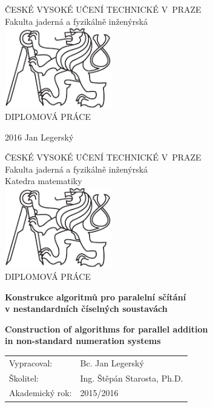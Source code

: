 \documentclass[a4paper, 11pt]{report}
\theoremstyle{definition}
\newcommand{\cvut}{ČESKÉ VYSOKÉ UČENÍ TECHNICKÉ V~PRAZE}
\newcommand{\fjfi}{Fakulta jaderná a fyzikálně inženýrská}
\newcommand{\km}{Katedra matematiky}
\newcommand{\nazevczBreaked}{Konstrukce algoritm\r u pro paraleln\'i s\v c\'it\'an\'i \\ v nestandardn\'ich \v c\'iseln\'ych soustav\'ach}
\newcommand{\nazevenBreaked}{Construction of algorithms for parallel addition  \\ in non-standard numeration systems}
\newcommand{\autor}{Bc. Jan Legersk\'y}
\newcommand{\vedouci}{Ing. \v St\v ep\'an Starosta, Ph.D.}
\begin{document}
\begin{titlepage}

 \thispagestyle{empty}
 \begin{center}
 	{\Large \cvut \\[12pt] \fjfi\\}   %
 	\vspace{45pt}
 	\includegraphics[height=100pt]{img/logoCVUT.pdf}\\  %
 	\vspace{160pt}
 	{\Huge DIPLOMOV\'A PR\'ACE}
 \end{center}
 \vfill
 {
 	\Large 2016 \hfill Jan Legersk\'y
 }
 \newpage


\thispagestyle{empty}
\begin{center}
	{\Large \cvut \\[10pt] \fjfi \\[10pt] \km\\}
	\vspace{45pt} %
	\includegraphics[height=100pt]{img/logoCVUT.pdf}\\
	\vspace{90pt}
	{\Large DIPLOMOV\'A PR\'ACE}
	\vspace{90pt}
	
	{\Large\bf \nazevczBreaked}
	\vspace{30pt}
	
	{\Large\bf \nazevenBreaked}
\end{center}
\vfill
{
	\Large
	\begin{tabular}{ll}
	Vypracoval: & \autor\\[3pt]
	\v Skolitel: & \vedouci\\[3pt]
	Akademick\'y rok: & 2015/2016
	\end{tabular}
}
\newpage



\end{titlepage}
\end{document}
